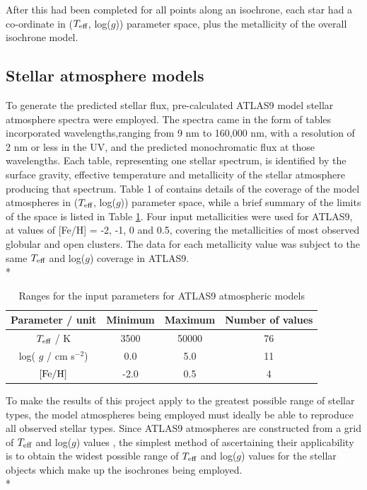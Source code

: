\documentclass[12pt, a4paper]{report}
\begin{document}
After this had been completed for all points along an isochrone, each star had a co-ordinate in ($T_{\textnormal{eff}}$, log($g$)) parameter space, plus the metallicity of the overall isochrone model.

\subsection{Stellar atmosphere models}
To generate the predicted stellar flux, pre-calculated ATLAS9 model stellar atmosphere spectra \citep{1993KurCD..13.....K} were employed. The spectra came in the form of tables incorporated wavelengths,ranging from 9 nm to 160,000 nm, with a resolution of 2 nm or less in the UV, and the predicted monochromatic flux at those wavelengths. Each table, representing one stellar spectrum, is identified by the surface gravity, effective temperature and metallicity of the stellar atmosphere producing that spectrum. Table 1 of \cite{2004astro.ph..5087C} contains details of the coverage of the model atmospheres in ($T_{\textnormal{eff}}$, log($g$)) parameter space, while a brief summary  of the limits of the space is listed in Table \ref{atlas9_input}. Four input metallicities were used for ATLAS9, at values of [Fe/H] = -2, -1, 0 and 0.5, covering the metallicities of most observed globular and open clusters. The data for each metallicity value was subject to the same $T_{\textnormal{eff}}$ and log($g$) coverage in ATLAS9.\\*

\begin{table}
\begin{center}
\begin{tabular}{cccc}
\hline
Parameter / unit & Minimum & Maximum & Number of values \\
\hline
$T_{\textnormal{eff}}$ / K & 3500 & 50000 & 76 \\
log( $g$ / cm s$^{-2}$) & 0.0 & 5.0 & 11 \\
$\textnormal{[Fe/H]}$ & -2.0 & 0.5 & 4 \\
\hline
\end{tabular}
\caption{Ranges for the input parameters for ATLAS9 atmospheric models}
\label{atlas9_input}
\end{center}
\end{table}

To make the results of this project apply to the greatest possible range of stellar types, the model atmospheres being employed must ideally be able to reproduce all observed stellar types. Since ATLAS9 atmospheres are constructed from a grid of $T_{\textnormal{eff}}$ and log($g$) values \citep{2004astro.ph..5087C}, the simplest method of ascertaining their applicability is to obtain the widest possible range of $T_{\textnormal{eff}}$ and log($g$) values for the stellar objects which make up the isochrones being employed.\\*
\end{document}
